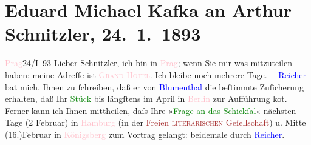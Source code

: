 

               \section[Eduard Michael Kafka an Arthur Schnitzler, 24. 1. 1893]{ Eduard Michael Kafka an Arthur Schnitzler, 24. 1. 1893}\nopagebreak{}\rehead{ }\normalsize\beginnumbering{} \toendnotes[C]{\smallbreak\pagebreak[2]} 
\toendnotes[C]{\smallbreak}\pstart
           \raggedleft{}{\pb}\textcolor{pink}{Prag}{}\ledrightnote{\textcolor{pink}{Prag}}{ }24/I 93\pend
           \pstart{}Lieber Schnitzler,\pend\pstart
           ich bin in \textcolor{pink}{Prag}{}\ledrightnote{\textcolor{pink}{Prag}}; wenn Sie mir was mitzuteilen haben:
               meine Adreſſe ist \textcolor{pink}{\textsc{Grand Hotel}}{}\ledrightnote{\textcolor{pink}{Grand Hotel Prag}}. Ich bleibe noch mehrere Tage. –\pend
           \pstart
           \textcolor{blue}{Reicher}{}\ledrightnote{\textcolor{blue}{Emanuel Reicher}} bat mich, Ihnen zu ſchreiben, daß er von
                  \textcolor{blue}{Blumenthal}{}\ledrightnote{\textcolor{blue}{Oskar Blumenthal}} die beſtimmte Zuſicherung erhalten,
               daß Ihr \textcolor{green}{Stück}{} bis längſtens {\pb}im April in \textcolor{pink}{Berlin}{}\ledrightnote{\textcolor{pink}{Berlin}} zur Aufführung ko{\geminationm}t.\pend
           \pstart
           Ferner kann ich Ihnen mittheilen, daſs Ihre »\textcolor{green}{Frage an
                  das Schickſal}{}\ledrightnote{\textcolor{green}{Die Frage an das Schicksal}}« nächsten Tage \introOben{}(2 Februar)\introOben{} in \textcolor{pink}{Hamburg}{}\ledrightnote{\textcolor{pink}{Hamburg}} (in der \textcolor{brown}{Freien
                     \textsc{literarischen} Geſellschaft}{}\ledrightnote{\textcolor{brown}{Freie literarische Gesellschaft Hamburg}}) u. Mitte \introOben{}(16.)\introOben{}{ }Februar in \textcolor{pink}{Königsberg}{}\ledrightnote{\textcolor{pink}{Kaliningrad}} zum Vortrag
               gelangt: beidemale durch \textcolor{blue}{Reicher}{}\ledrightnote{\textcolor{blue}{Emanuel Reicher}}.\pend
